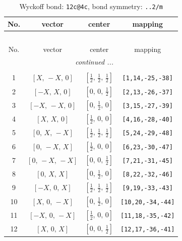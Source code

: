 \documentclass[fleqn,8pt]{jsarticle}
\begin{document}
\renewcommand{\arraystretch}{1.2}
\begin{longtable}{cccc}
\caption{Wyckoff bond: {\tt 12c@4c}, bond symmetry: {\tt ..2/m}}
 \\
 \hline \hline
No. & vector & center & mapping \\ \hline \endfirsthead

\multicolumn{3}{l}{\tablename\ \thetable{}} \\
 \hline \hline
No. & vector & center & mapping \\ \hline \endhead

 \hline \hline
\multicolumn{3}{r}{\footnotesize\it continued ...} \\ \endfoot

 \hline \hline
\multicolumn{3}{r}{} \\ \endlastfoot

1 & $\left[ X,\, - X,\, 0 \right]$ & $\left[ \frac{1}{2},\, \frac{1}{2},\, \frac{1}{2} \right]$ & {\tt [1,14,-25,-38]} \\ \hline
2 & $\left[ - X,\, X,\, 0 \right]$ & $\left[ 0,\, 0,\, \frac{1}{2} \right]$ & {\tt [2,13,-26,-37]} \\ \hline
3 & $\left[ - X,\, - X,\, 0 \right]$ & $\left[ 0,\, \frac{1}{2},\, 0 \right]$ & {\tt [3,15,-27,-39]} \\ \hline
4 & $\left[ X,\, X,\, 0 \right]$ & $\left[ \frac{1}{2},\, 0,\, 0 \right]$ & {\tt [4,16,-28,-40]} \\ \hline
5 & $\left[ 0,\, X,\, - X \right]$ & $\left[ \frac{1}{2},\, \frac{1}{2},\, \frac{1}{2} \right]$ & {\tt [5,24,-29,-48]} \\ \hline
6 & $\left[ 0,\, - X,\, X \right]$ & $\left[ \frac{1}{2},\, 0,\, 0 \right]$ & {\tt [6,23,-30,-47]} \\ \hline
7 & $\left[ 0,\, - X,\, - X \right]$ & $\left[ 0,\, 0,\, \frac{1}{2} \right]$ & {\tt [7,21,-31,-45]} \\ \hline
8 & $\left[ 0,\, X,\, X \right]$ & $\left[ 0,\, \frac{1}{2},\, 0 \right]$ & {\tt [8,22,-32,-46]} \\ \hline
9 & $\left[ - X,\, 0,\, X \right]$ & $\left[ \frac{1}{2},\, \frac{1}{2},\, \frac{1}{2} \right]$ & {\tt [9,19,-33,-43]} \\ \hline
10 & $\left[ X,\, 0,\, - X \right]$ & $\left[ 0,\, \frac{1}{2},\, 0 \right]$ & {\tt [10,20,-34,-44]} \\ \hline
11 & $\left[ - X,\, 0,\, - X \right]$ & $\left[ \frac{1}{2},\, 0,\, 0 \right]$ & {\tt [11,18,-35,-42]} \\ \hline
12 & $\left[ X,\, 0,\, X \right]$ & $\left[ 0,\, 0,\, \frac{1}{2} \right]$ & {\tt [12,17,-36,-41]} \\
\end{longtable}
\end{document}
